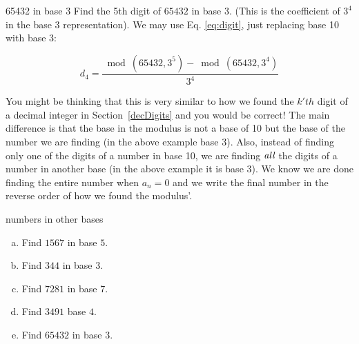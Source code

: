 \begin{example}{65432 in base 3}
Find the 5th digit of $65432$ in base $3$. (This is the coefficient of $3^4$ in the base 3 representation). We may use 
Eq. \ref{eq:digit}, just replacing base 10 with base 3:

\begin{equation*}
d_{4}=\frac{\bmod(65432,3^{5})-\bmod(65432,3^{4})}{3^{4}}
\end{equation*}
\end{example}

You might be thinking that this is very similar to how we found the $k'th$ digit of a decimal integer in Section~\ref{decDigits} and you would be correct! The main difference  is that the base in the modulus is not a base of 10 but the base of the number we are finding (in the above example base 3). Also, instead of finding only one of the digits of a number in base 10, we are finding $\emph{all}$ the digits of a number in another base (in the above example it is base 3). We know we are done finding the entire number when $a_{n}=0$ and we write the final number in the reverse order of how we found the modulus'.

\begin{exercise}{numbers in other bases}
\begin{enumerate}[(a)]
\item Find $1567$ in base $5$.
\item Find $344$ in base $3$.
\item Find $7281$ in base $7$.
\item Find $3491$ base $4$.
\item Find $65432$ in base $3$.
\end{enumerate}
\end{exercise}

